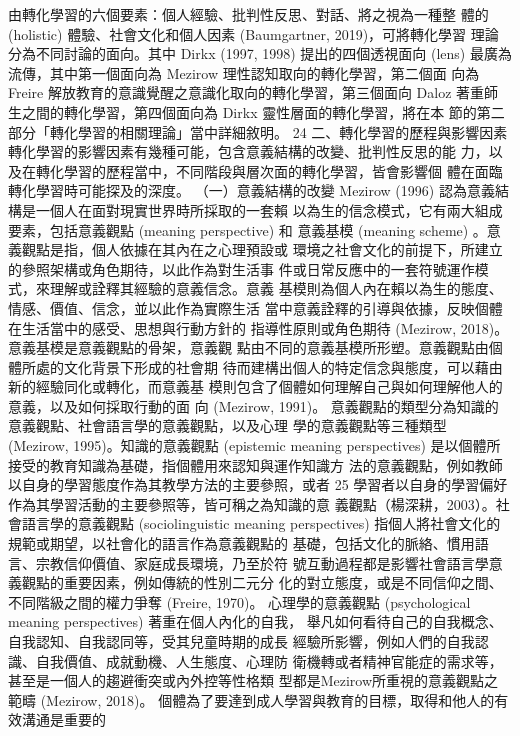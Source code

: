 由轉化學習的六個要素：個人經驗、批判性反思、對話、將之視為一種整
體的 (holistic) 體驗、社會文化和個人因素 (Baumgartner, 2019)，可將轉化學習
理論分為不同討論的面向。其中 Dirkx (1997, 1998) 提出的四個透視面向 (lens) 
最廣為流傳，其中第一個面向為 Mezirow 理性認知取向的轉化學習，第二個面
向為 Freire 解放教育的意識覺醒之意識化取向的轉化學習，第三個面向 Daloz
著重師生之間的轉化學習，第四個面向為 Dirkx 靈性層面的轉化學習，將在本
節的第二部分「轉化學習的相關理論」當中詳細敘明。 
24 
二、轉化學習的歷程與影響因素 
轉化學習的影響因素有幾種可能，包含意義結構的改變、批判性反思的能
力，以及在轉化學習的歷程當中，不同階段與層次面的轉化學習，皆會影響個
體在面臨轉化學習時可能探及的深度。 
（一）意義結構的改變 
Mezirow (1996) 認為意義結構是一個人在面對現實世界時所採取的一套賴
以為生的信念模式，它有兩大組成要素，包括意義觀點 (meaning perspective) 和
意義基模 (meaning scheme) 。意義觀點是指，個人依據在其內在之心理預設或
環境之社會文化的前提下，所建立的參照架構或角色期待，以此作為對生活事
件或日常反應中的一套符號運作模式，來理解或詮釋其經驗的意義信念。意義
基模則為個人內在賴以為生的態度、情感、價值、信念，並以此作為實際生活
當中意義詮釋的引導與依據，反映個體在生活當中的感受、思想與行動方針的
指導性原則或角色期待 (Mezirow, 2018)。意義基模是意義觀點的骨架，意義觀
點由不同的意義基模所形塑。意義觀點由個體所處的文化背景下形成的社會期
待而建構出個人的特定信念與態度，可以藉由新的經驗同化或轉化，而意義基
模則包含了個體如何理解自己與如何理解他人的意義，以及如何採取行動的面
向 (Mezirow, 1991)。 
意義觀點的類型分為知識的意義觀點、社會語言學的意義觀點，以及心理
學的意義觀點等三種類型 (Mezirow, 1995)。知識的意義觀點 (epistemic meaning 
perspectives) 是以個體所接受的教育知識為基礎，指個體用來認知與運作知識方
法的意義觀點，例如教師以自身的學習態度作為其教學方法的主要參照，或者
25 
學習者以自身的學習偏好作為其學習活動的主要參照等，皆可稱之為知識的意
義觀點（楊深耕，2003）。社會語言學的意義觀點 (sociolinguistic meaning 
perspectives) 指個人將社會文化的規範或期望，以社會化的語言作為意義觀點的
基礎，包括文化的脈絡、慣用語言、宗教信仰價值、家庭成長環境，乃至於符
號互動過程都是影響社會語言學意義觀點的重要因素，例如傳統的性別二元分
化的對立態度，或是不同信仰之間、不同階級之間的權力爭奪 (Freire, 1970)。
心理學的意義觀點 (psychological meaning perspectives) 著重在個人內化的自我，
舉凡如何看待自己的自我概念、自我認知、自我認同等，受其兒童時期的成長
經驗所影響，例如人們的自我認識、自我價值、成就動機、人生態度、心理防
衛機轉或者精神官能症的需求等，甚至是一個人的趨避衝突或內外控等性格類
型都是Mezirow所重視的意義觀點之範疇 (Mezirow, 2018)。 
個體為了要達到成人學習與教育的目標，取得和他人的有效溝通是重要的
